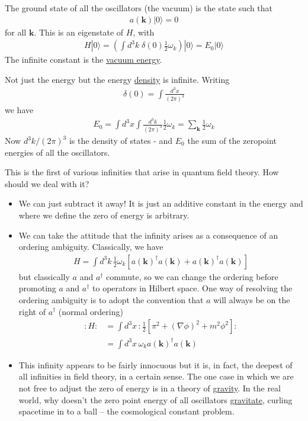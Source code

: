 \documentclass{article}
\begin{document}
The ground state of all the oscillators (the vacuum) is the state such that
\begin{align}
a(\mathbf{k})|0\rangle=0
\end{align}
for all $\mathbf{k}$. This is an eigenstate of $H$, with
\begin{align}
H|0\rangle=\left(\int d^3k\;\delta(0)\frac{1}{2}\omega_k\right)|0\rangle=E_0|0\rangle
\end{align}
The infinite constant is the \underline{vacuum energy}.

Not just the energy but the energy \underline{density} is infinite. Writing 
\begin{align}
\delta(0)=\int\frac{d^3x}{(2\pi)^3}
\end{align}
we have
\begin{align}
E_0=\int d^3x\int \frac{d^3k}{(2\pi)^3}\frac{1}{2}\omega_k=\sum_{\mathbf{k}}\frac{1}{2}\omega_k
\end{align}
Now $d^3k/(2\pi)^3$ is the density of states - and $E_0$ the sum of the zeropoint energies of all the oscillators.

This is the first of various infinities that arise in quantum field theory. How should we deal with it?
\begin{itemize}
\item We can just subtract it away! It is just an additive constant in the energy and where we define the zero of energy is arbitrary.
\item We can take the attitude that the infinity arises as a consequence of an ordering ambiguity. Classically, we have 
\begin{align}
H=\int d^3k\,\frac{1}{2}\omega_k[a(\mathbf{k})^\dagger a(\mathbf{k})+a(\mathbf{k})^\dagger a(\mathbf{k})]
\end{align}
but classically $a$ and $a^\dagger$ commute, so we can change the ordering before promoting $a$ and $a^\dagger$ to operators in Hilbert space. One way of resolving the ordering ambiguity is to adopt the convention that $a$ will always be on the right of $a^\dagger$ (normal ordering)
\begin{align}
:H:
&=\int d^3x\,:\frac{1}{2}[\pi^2+(\nabla\phi)^2+m^2\phi^2]:\\
&=\int d^3x\,\omega_k a(\mathbf{k})^\dagger a(\mathbf{k})
\end{align}
\item This infinity appears to be fairly innocuous but it is, in fact, the deepest of all infinities in field theory, in a certain sense. The one case in which we are not free to adjust the zero of energy is in a theory of \underline{gravity}. In the real world, 
why doesn't the zero point energy of all oscillators \underline{gravitate}, curling spacetime in to a ball -- the cosmological constant problem.
\end{itemize}
\end{document}
